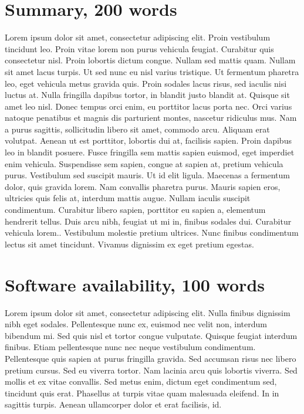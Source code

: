 \documentclass[techmemo]{ecmwfrep}%
\begin{document}
\section{Summary, 200 words}
Lorem ipsum dolor sit amet, consectetur adipiscing elit. Proin vestibulum tincidunt leo. Proin vitae lorem non purus vehicula feugiat. Curabitur quis consectetur nisl. Proin lobortis dictum congue. Nullam sed mattis quam. Nullam sit amet lacus turpis. Ut sed nunc eu nisl varius tristique. Ut fermentum pharetra leo, eget vehicula metus gravida quis. Proin sodales lacus risus, sed iaculis nisi luctus at. Nulla fringilla dapibus tortor, in blandit justo blandit at. Quisque sit amet leo nisl. Donec tempus orci enim, eu porttitor lacus porta nec. Orci varius natoque penatibus et magnis dis parturient montes, nascetur ridiculus mus. Nam a purus sagittis, sollicitudin libero sit amet, commodo arcu. Aliquam erat volutpat. Aenean ut est porttitor, lobortis dui at, facilisis sapien. Proin dapibus leo in blandit posuere. Fusce fringilla sem mattis sapien euismod, eget imperdiet enim vehicula. Suspendisse sem sapien, congue at sapien at, pretium vehicula purus. Vestibulum sed suscipit mauris. Ut id elit ligula. Maecenas a fermentum dolor, quis gravida lorem. Nam convallis pharetra purus. Mauris sapien eros, ultricies quis felis at, interdum mattis augue. Nullam iaculis suscipit condimentum. Curabitur libero sapien, porttitor eu sapien a, elementum hendrerit tellus. Duis arcu nibh, feugiat ut mi in, finibus sodales dui. Curabitur vehicula lorem.. Vestibulum molestie pretium ultrices. Nunc finibus condimentum lectus sit amet tincidunt. Vivamus dignissim ex eget pretium egestas.

\section{Software availability, 100 words}
Lorem ipsum dolor sit amet, consectetur adipiscing elit. Nulla finibus dignissim nibh eget sodales. Pellentesque nunc ex, euismod nec velit non, interdum bibendum mi. Sed quis nisl et tortor congue vulputate. Quisque feugiat interdum finibus. Etiam pellentesque nunc nec neque vestibulum condimentum. Pellentesque quis sapien at purus fringilla gravida. Sed accumsan risus nec libero pretium cursus. Sed eu viverra tortor. Nam lacinia arcu quis lobortis viverra. Sed mollis et ex vitae convallis. Sed metus enim, dictum eget condimentum sed, tincidunt quis erat. Phasellus at turpis vitae quam malesuada eleifend. In in sagittis turpis. Aenean ullamcorper dolor et erat facilisis, id.
\end{document}
